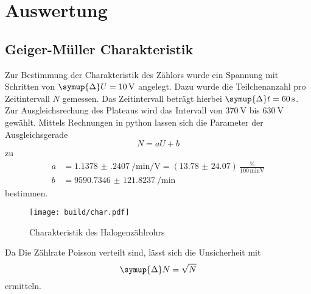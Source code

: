 \section{Auswertung}
\label{sec:Auswertung}
\subsection{Geiger-Müller Charakteristik}
Zur Bestimmung der Charakteristik des Zählors wurde ein Spannung mit Schritten von $\symup{\Delta} U = \SI{10}{\volt}$ angelegt.
Dazu wurde die Teilchenanzahl pro Zeitintervall $N$ gemessen. 
Das Zeitintervall beträgt hierbei $\symup{\Delta} t = \SI{60}{\second}$.
Zur Ausgleichsrechung des Plateaus wird das Intervall von $\SI{370}{\volt}$ bis $\SI{630}{\volt}$ gewählt.
Mittels Rechnungen in python lassen sich die Parameter der Ausgleichsgerade 
\begin{equation}
  N = aU + b
\end{equation}
zu 
\begin{align*}
  a &= \SI{1.1378(2407)}{\per\minute\per\volt} = ( \num{13.78(2407)} )  \,\frac{\si{\percent}}{100 \, \si{\minute\volt}} \\
  b &= \SI{9590.7346(1218237)}{\per\minute}
\end{align*}
bestimmen.
\begin{figure}
  \centering
  \caption{Charakteristik des Halogenzählrohrs}
  \texttt{[image: build/char.pdf]}
\end{figure}
Da Die Zählrate Poisson verteilt sind, lässt sich die Unsicherheit mit 
\begin{equation}
  \symup{\Delta} N = \sqrt{N}
\end{equation}
ermitteln.
